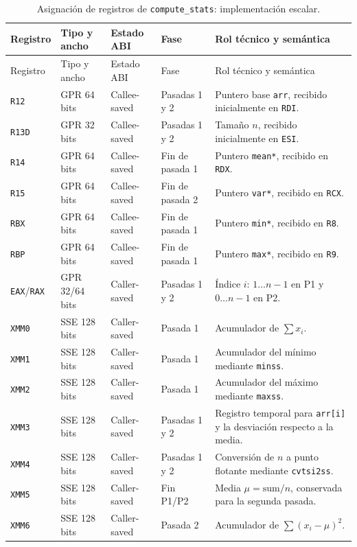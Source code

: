 \documentclass[journal]{IEEEtran}
\begin{document}
\begin{longtable}{@{}>{\raggedright\arraybackslash}p{}
  >{\raggedright\arraybackslash}p{}
  >{\raggedright\arraybackslash}p{}
  >{\raggedright\arraybackslash}p{}
  >{\raggedright\arraybackslash}p{}@{}}
\caption{Asignación de registros de \texttt{compute\_stats}: implementación escalar.}
\label{tab:compute-stats-scalar-registers}\\
\toprule
Registro & Tipo y ancho & Estado ABI & Fase & Rol técnico y semántica \\
\midrule
\endfirsthead
\toprule
Registro & Tipo y ancho & Estado ABI & Fase & Rol técnico y semántica \\
\midrule
\endhead
\bottomrule
\endfoot
\texttt{R12} & GPR 64 bits & Callee-saved & Pasadas 1 y 2 & Puntero base
  \texttt{arr}, recibido inicialmente en \texttt{RDI}. \\
\texttt{R13D} & GPR 32 bits & Callee-saved & Pasadas 1 y 2 & Tamaño $n$,
  recibido inicialmente en \texttt{ESI}. \\
\texttt{R14} & GPR 64 bits & Callee-saved & Fin de pasada 1 & Puntero
  \texttt{mean*}, recibido en \texttt{RDX}. \\
\texttt{R15} & GPR 64 bits & Callee-saved & Fin de pasada 2 & Puntero
  \texttt{var*}, recibido en \texttt{RCX}. \\
\texttt{RBX} & GPR 64 bits & Callee-saved & Fin de pasada 1 & Puntero
  \texttt{min*}, recibido en \texttt{R8}. \\
\texttt{RBP} & GPR 64 bits & Callee-saved & Fin de pasada 1 & Puntero
  \texttt{max*}, recibido en \texttt{R9}. \\
\texttt{EAX}/\texttt{RAX} & GPR 32/64 bits & Caller-saved & Pasadas 1 y 2 &
  Índice $i$: $1\ldots n-1$ en P1 y $0\ldots n-1$ en P2. \\
\texttt{XMM0} & SSE 128 bits & Caller-saved & Pasada 1 & Acumulador de
  $\sum x_i$. \\
\texttt{XMM1} & SSE 128 bits & Caller-saved & Pasada 1 & Acumulador del
  mínimo mediante \texttt{minss}. \\
\texttt{XMM2} & SSE 128 bits & Caller-saved & Pasada 1 & Acumulador del
  máximo mediante \texttt{maxss}. \\
\texttt{XMM3} & SSE 128 bits & Caller-saved & Pasadas 1 y 2 & Registro
  temporal para \texttt{arr[i]} y la desviación respecto a la media. \\
\texttt{XMM4} & SSE 128 bits & Caller-saved & Pasadas 1 y 2 & Conversión de
  $n$ a punto flotante mediante \texttt{cvtsi2ss}. \\
\texttt{XMM5} & SSE 128 bits & Caller-saved & Fin P1/P2 & Media
  $\mu=\mathrm{sum}/n$, conservada para la segunda pasada. \\
\texttt{XMM6} & SSE 128 bits & Caller-saved & Pasada 2 & Acumulador de
  $\sum(x_i-\mu)^2$. \\
\end{longtable}
\end{document}
